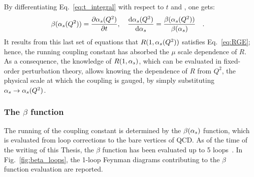 By differentiating Eq.~\ref{eq:t_integral} with respect to $t$ and \als, one gets:
\begin{equation}\label{eq:beta_def}
    \beta(\alpha_s(Q^2)) = \frac{\partial\alpha_s(Q^2)}{\partial t}, \quad \frac{\mathrm{d}\alpha_s(Q^2)}{\mathrm{d}\alpha_s} = \frac{\beta(\alpha_s (Q^2))}{\beta(\alpha_s)}\quad .
\end{equation}
It results from this last set of equations that $R(1,\alpha_s(Q^2))$ satisfies Eq.~\ref{eq:RGE}; hence, the running coupling constant has absorbed the $\mu$ scale dependence of $R$. As a consequence, the knowledge of $R(1,\alpha_s)$, which can be evaluated in fixed-order perturbation theory, allows knowing the dependence of $R$ from $Q^2$, the physical scale at which the coupling is gauged, by simply substituting $\alpha_s \rightarrow \alpha_s(Q^2)$. 

\subsubsection{The \ensuremath{\beta} function}
The running of the coupling constant is determined by the $\beta(\alpha_s)$ function, which is evaluated from loop corrections to the bare vertices of QCD. As of the time of the writing of this Thesis, the $\beta$ function has been evaluated up to 5 loops~\cite{Herzog:2017ohr}. In Fig.~\ref{fig:beta_loops}, the 1-loop Feynman diagrams contributing to the $\beta$ function evaluation are reported.

